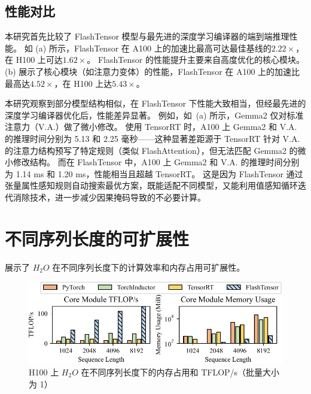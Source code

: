 \subsection{性能对比}

本研究首先比较了 FlashTensor 模型与最先进的深度学习编译器的端到端推理性能。
如 (a) 所示，FlashTensor 在 A100 上的加速比最高可达最佳基线的\(2.22\times\)，在 H100 上可达\(1.62\times\)。
FlashTensor 的性能提升主要来自高度优化的核心模块。
(b) 展示了核心模块（如注意力变体）的性能，FlashTensor 在 A100 上的加速比最高达\(4.52\times\)，在 H100 上达\(5.43\times\)。

本研究观察到部分模型结构相似，在 FlashTensor 下性能大致相当，但经最先进的深度学习编译器优化后，性能差异显著。
例如，如~(a) 所示，Gemma2 仅对标准注意力（V.A.）做了微小修改。
使用 TensorRT 时，A100 上 Gemma2 和 V.A. 的推理时间分别为 5.13 和 2.25 毫秒——这种显著差距源于 TensorRT 针对 V.A. 的注意力结构预写了特定规则（类似 FlashAttention），但无法匹配 Gemma2 的微小修改结构。
而在 FlashTensor 中，A100 上 Gemma2 和 V.A. 的推理时间分别为 1.14 ms 和 1.20 ms，性能相当且超越 TensorRT。
这是因为 FlashTensor 通过张量属性感知规则自动搜索最优方案，既能适配不同模型，又能利用值感知循环迭代消除技术，进一步减少因果掩码导致的不必要计算。

\section{不同序列长度的可扩展性}
 展示了 \(H_{2}O\) 在不同序列长度下的计算效率和内存占用可扩展性。  
\begin{figure}[ht]
    \centering
    \includegraphics[width=\linewidth]{figures/flashtensor/gflops_mem-crop.pdf}
    \caption{H100 上 \(H_{2}O\) 在不同序列长度下的内存占用和 TFLOP/s（批量大小为 1）}
    \label{fig:seqlen_mem_flops}
\end{figure}

